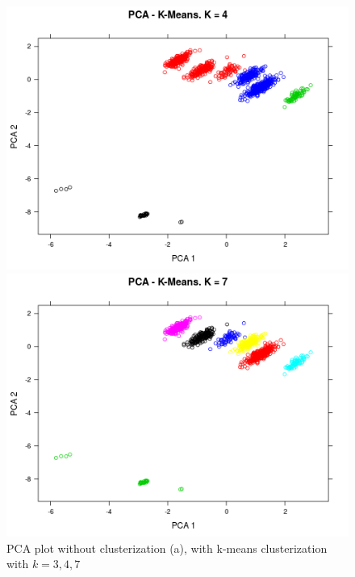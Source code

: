 \begin{figure}[h]
\begin{minipage}[h]{0.49\linewidth}
	\end{minipage}
	\begin{minipage}[h]{0.49\linewidth}
\includegraphics[width=\linewidth]{images/kmean4}
	\end{minipage}
	\hfill
	\begin{minipage}[h]{0.49\linewidth}
\includegraphics[width=\linewidth]{images/kmean7}
	\end{minipage}
	\caption{PCA plot without clusterization (a), with k-means clusterization with $k=3,4,7$}
	\label{fig:k-means}
\end{figure} 

